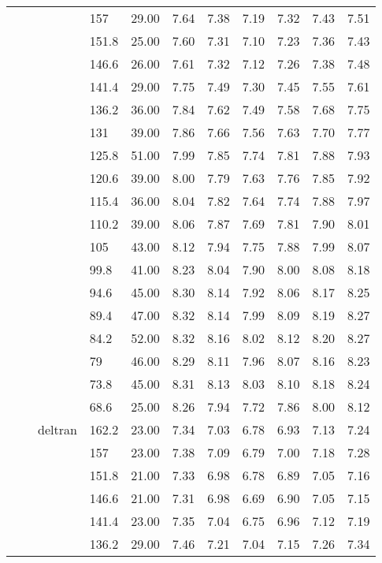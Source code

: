 \begin{longtable}{llllrrrrrrr}
   &  &  & 157 & 29.00 & 7.64 & 7.38 & 7.19 & 7.32 & 7.43 & 7.51 \\ 
   &  &  & 151.8 & 25.00 & 7.60 & 7.31 & 7.10 & 7.23 & 7.36 & 7.43 \\ 
   &  &  & 146.6 & 26.00 & 7.61 & 7.32 & 7.12 & 7.26 & 7.38 & 7.48 \\ 
   &  &  & 141.4 & 29.00 & 7.75 & 7.49 & 7.30 & 7.45 & 7.55 & 7.61 \\ 
   &  &  & 136.2 & 36.00 & 7.84 & 7.62 & 7.49 & 7.58 & 7.68 & 7.75 \\ 
   &  &  & 131 & 39.00 & 7.86 & 7.66 & 7.56 & 7.63 & 7.70 & 7.77 \\ 
   &  &  & 125.8 & 51.00 & 7.99 & 7.85 & 7.74 & 7.81 & 7.88 & 7.93 \\ 
   &  &  & 120.6 & 39.00 & 8.00 & 7.79 & 7.63 & 7.76 & 7.85 & 7.92 \\ 
   &  &  & 115.4 & 36.00 & 8.04 & 7.82 & 7.64 & 7.74 & 7.88 & 7.97 \\ 
   &  &  & 110.2 & 39.00 & 8.06 & 7.87 & 7.69 & 7.81 & 7.90 & 8.01 \\ 
   &  &  & 105 & 43.00 & 8.12 & 7.94 & 7.75 & 7.88 & 7.99 & 8.07 \\ 
   &  &  & 99.8 & 41.00 & 8.23 & 8.04 & 7.90 & 8.00 & 8.08 & 8.18 \\ 
   &  &  & 94.6 & 45.00 & 8.30 & 8.14 & 7.92 & 8.06 & 8.17 & 8.25 \\ 
   &  &  & 89.4 & 47.00 & 8.32 & 8.14 & 7.99 & 8.09 & 8.19 & 8.27 \\ 
   &  &  & 84.2 & 52.00 & 8.32 & 8.16 & 8.02 & 8.12 & 8.20 & 8.27 \\ 
   &  &  & 79 & 46.00 & 8.29 & 8.11 & 7.96 & 8.07 & 8.16 & 8.23 \\ 
   &  &  & 73.8 & 45.00 & 8.31 & 8.13 & 8.03 & 8.10 & 8.18 & 8.24 \\ 
   &  &  & 68.6 & 25.00 & 8.26 & 7.94 & 7.72 & 7.86 & 8.00 & 8.12 \\ 
   &  & deltran & 162.2 & 23.00 & 7.34 & 7.03 & 6.78 & 6.93 & 7.13 & 7.24 \\ 
   &  &  & 157 & 23.00 & 7.38 & 7.09 & 6.79 & 7.00 & 7.18 & 7.28 \\ 
   &  &  & 151.8 & 21.00 & 7.33 & 6.98 & 6.78 & 6.89 & 7.05 & 7.16 \\ 
   &  &  & 146.6 & 21.00 & 7.31 & 6.98 & 6.69 & 6.90 & 7.05 & 7.15 \\ 
   &  &  & 141.4 & 23.00 & 7.35 & 7.04 & 6.75 & 6.96 & 7.12 & 7.19 \\ 
   &  &  & 136.2 & 29.00 & 7.46 & 7.21 & 7.04 & 7.15 & 7.26 & 7.34 \\ 

\end{longtable}
